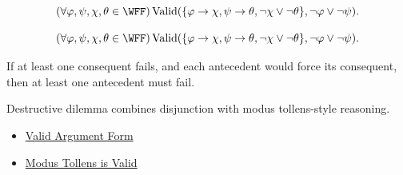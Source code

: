 \begin{remark*}
\[
(\forall\varphi,\psi,\chi,\theta\in\WFF)
\operatorname{Valid}(\{\varphi\to\chi,\psi\to\theta,\neg\chi\lor\neg\theta\},\neg\varphi\lor\neg\psi).
\]
\end{remark*}

\begin{remark*}
\[
(\forall\varphi,\psi,\chi,\theta\in\WFF)
\operatorname{Valid}(\{\varphi\to\chi,\psi\to\theta,\neg\chi\lor\neg\theta\},\neg\varphi\lor\neg\psi).
\]

If at least one consequent fails, and each antecedent would force its
consequent, then at least one antecedent must fail.
\end{remark*}

\begin{remark*}[Interpretation]
Destructive dilemma combines disjunction with modus tollens-style reasoning.
\end{remark*}

\begin{dependencies}
\begin{itemize}
  \item \hyperref[def:valid-argument-form-propositional-logic]{Valid Argument Form}
  \item \hyperref[thm:modus-tollens-validity-propositional-logic]{Modus Tollens is Valid}
\end{itemize}
\end{dependencies}
